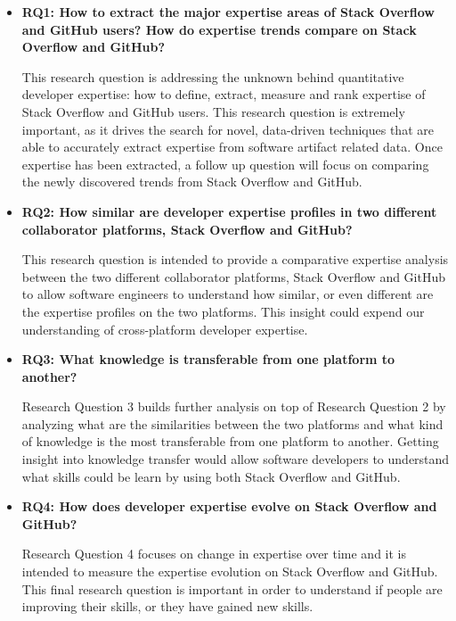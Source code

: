         \begin{itemize}
            \item \textbf{RQ1: How to extract the major expertise areas of Stack Overflow and GitHub users? How do expertise trends compare on Stack Overflow and GitHub?}
            
            This research question is addressing the unknown behind quantitative developer expertise: how to define, extract, measure and rank expertise of Stack Overflow and GitHub users. This research question is extremely important, as it drives the search for novel, data-driven techniques that are able to accurately extract expertise from software artifact related data. Once expertise has been extracted, a follow up question will focus on comparing the newly discovered trends from Stack Overflow and GitHub.
            
            \item \textbf{RQ2: How similar are developer expertise profiles in two different collaborator platforms, Stack Overflow and GitHub?}
            
            This research question is intended to provide a comparative expertise analysis between the two different collaborator platforms, Stack Overflow and GitHub to allow software engineers to understand how similar, or even different are the expertise profiles on the two platforms. This insight could expend our understanding of cross-platform developer expertise.
            
            \item \textbf{RQ3: What knowledge is transferable from one platform to another?}
            
            Research Question 3 builds further analysis on top of Research Question 2 by analyzing what are the similarities between the two platforms and what kind of knowledge is the most transferable from one platform to another. Getting insight into knowledge transfer would allow software developers to understand what skills could be learn by using both Stack Overflow and GitHub.
            
            \item \textbf{RQ4: How does developer expertise evolve on Stack Overflow and GitHub?}
            
            Research Question 4 focuses on change in expertise over time and it is intended to measure the expertise evolution on Stack Overflow and GitHub. This final research question is important in order to understand if people are improving their skills, or they have gained new skills.
        \end{itemize}
        
